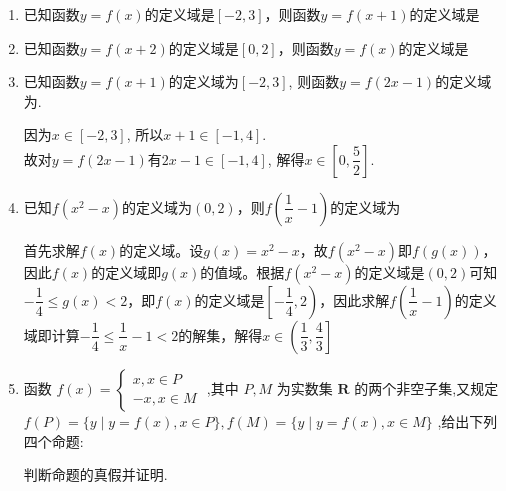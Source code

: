 \begin{enumerate}
    \item 已知函数$y = f(x)$的定义域是$[-2, 3]$，则函数$y = f(x+1)$的定义域是 \blkda{$[-3, 2]$}
    \item 已知函数$y = f(x+2)$的定义域是$[0, 2]$，则函数$y = f(x)$的定义域是 \blkda{$[2, 4]$}
    \item 已知函数$y=f(x+1)$的定义域为$[-2,3]$, 则函数$y=f(2x-1)$的定义域为.
    \begin{jieda}
    因为$x\in[-2,3]$, 所以$x+1\in[-1,4]$.\\
    故对$y=f(2x-1)$有$2x-1\in[-1,4]$, 解得$x\in\left[0,\dfrac{5}{2}\right]$.
    \end{jieda}
    \item 已知$f(x^2-x)$的定义域为$(0, 2)$，则$f\left(\dfrac{1}{x} - 1\right)$的定义域为\blkda{$\left(\dfrac{1}{3}, \dfrac{4}{3}\right]$ \\}
    \begin{jieda}
        首先求解$f(x)$的定义域。设$g(x) = x^2-x$，故$f(x^2-x)$即$f(g(x))$，因此$f(x)$的定义域即$g(x)$的值域。根据$f(x^2-x)$的定义域是$(0, 2)$可知$-\dfrac{1}{4} \leq g(x) < 2$，即$f(x)$的定义域是$\left[-\dfrac{1}{4}, 2\right)$，因此求解$f(\dfrac{1}{x} - 1)$的定义域即计算$-\dfrac{1}{4} \leq \dfrac{1}{x} - 1 < 2$的解集，解得$x \in \left(\dfrac{1}{3}, \dfrac{4}{3}\right]$
    \end{jieda}
    
    \item 函数 $f\left( x\right)  = \left\{  \begin{array}{l} x,x \in  P \\   - x,x \in  M \end{array}\right.$ ,其中 $P,M$ 为实数集 $\mathbf{R}$ 的两个非空子集,又规定 $f\left( P\right)  = \{ y \mid  y = f\left( x\right) ,x \in  P\} ,f\left( M\right)  = \{ y \mid  y = f\left( x\right) ,x \in  M\}$ ,给出下列四个命题: 
    判断命题的真假并证明.


\end{enumerate}
